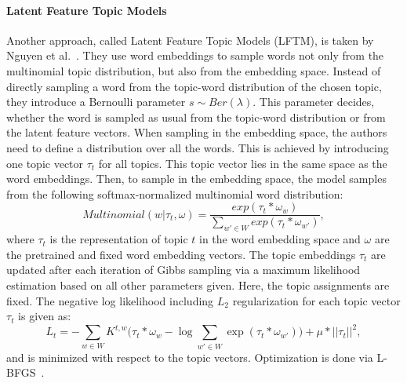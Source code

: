 \documentclass[
        a4paper,
        titlepage,
        twoside,
        parskip
        ]{scrbook}
\theoremstyle{break}
\begin{document}
\paragraph{Latent Feature Topic Models}
Another approach, called Latent Feature Topic Models (LFTM), is taken by Nguyen et al.~\cite{Nguyen2015}.
They use word embeddings to sample words not only from the multinomial topic distribution, but also from the embedding space.
Instead of directly sampling a word from the topic-word distribution of the chosen topic, they introduce a Bernoulli parameter $s \sim Ber(\lambda)$.
This parameter decides, whether the word is sampled as usual from the topic-word distribution or from the latent feature vectors.
When sampling in the embedding space, the authors need to define a distribution over all the words.
This is achieved by introducing one topic vector $\tau_t$ for all topics.
This topic vector lies in the same space as the word embeddings.
Then, to sample in the embedding space, the model samples from the following softmax-normalized multinomial word distribution:
\begin{equation*}
    Multinomial(w | \tau_t, \omega) = \frac{exp(\tau_t * \omega_w)}{\sum_{w' \in W} exp(\tau_t * \omega_{w'})},
\end{equation*}
where $\tau_t$ is the representation of topic $t$ in the word embedding space and $\omega$ are the pretrained and fixed word embedding vectors.
The topic embeddings $\tau_t$ are updated after each iteration of Gibbs sampling via a maximum likelihood estimation based on all other parameters given.
Here, the topic assignments are fixed.
The negative log likelihood including $L_2$ regularization for each topic vector $\tau_t$ is given as:
\begin{equation*}
    L_t = - \sum_{w \in W} K^{t,w} \Big(\tau_t * \omega_w - \log \sum_{w' \in W} \exp (\tau_t * \omega_{w'}) \Big) + \mu * || \tau_t ||^2,
\end{equation*}
and is minimized with respect to the topic vectors.
Optimization is done via L-BFGS~\cite{Liu1989}.
\end{document}
